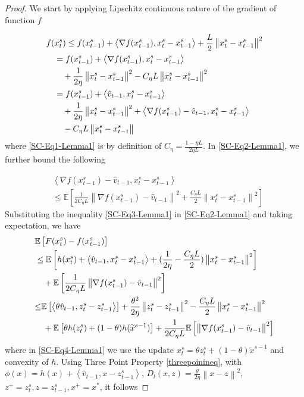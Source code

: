\documentclass{article}
\newcommand*{\E}{\mathbb{E}}
\newcommand{\norm}[1]{\left\lVert#1\right\rVert}
\newcommand{\Iprod}[2]{\left\langle #1,#2\right\rangle}
\theoremstyle{definition}
\theoremstyle{remark}
\begin{document}
{
\begin{proof}
We start by applying Lipschitz continuous nature of the gradient of function $f$ 

\begin{align}
f(&x_{t}^s)  \leq f(x_{t-1}^s) + \Iprod{\nabla f(x_{t-1}^s)}{x_{t}^s-x_{t-1}^s}+\frac{L}{2}\norm{x_{t}^s-x_{t-1}^s}^2\notag\\
&=f(x_{t-1}^s) + \Iprod{\nabla f(x_{t-1}^s)}{x_{t}^s-x_{t-1}^s}\notag\\
&~~~+ {\frac{1 }{2\eta}}\norm{x_{t}^s-x_{t-1}^s}^2-{C_{\eta} L}\norm{x_{t}^s-x_{t-1}^s}^2\label{SC-Eq1-Lemma1}\\
&= f(x_{t-1}^s) + \Iprod{\hat{v}_{t-1}}{x_{t}^s-x_{t-1}^s}\notag\\
&~~~+ { \frac{1}{2\eta}}\norm{x_{t}^s-x_{t-1}^s}^2+\Iprod{\nabla f(x_{t-1}^s)-\hat{v}_{t-1}}{x_{t}^s-x_{t-1}^s}\notag\\
&~~~-{C_{\eta} L}\norm{x_{t}^s-x_{t-1}^s}\label{SC-Eq2-Lemma1}
\end{align}
where \eqref{SC-Eq1-Lemma1} is by definition of $C_{\eta} = \frac{1-\eta L}{2\eta L}$. 
In \eqref{SC-Eq2-Lemma1}, we further bound the following

\begin{equation}\label{SC-Eq3-Lemma1}
\begin{split}
&\Iprod{\nabla f(x_{t-1}^s)-\hat{v}_{t-1}}{x_{t}^s-x_{t-1}^s}\\
&{\leq} \E\left[\frac{1}{2C_{\eta} L}\norm{\nabla f(x_{t-1}^s)-\hat{v}_{t-1}}^2 + \frac{C_{\eta} L}{2}\norm{x_{t}^s-x_{t-1}^s}^2\right]
\end{split}
\end{equation}
Substituting the inequality \eqref{SC-Eq3-Lemma1} in \eqref{SC-Eq2-Lemma1} and taking expectation, we have
\begin{align}
&\E \left[ F(x_{t}^s) -f(x_{t-1}^s)\right]\notag\\
&\leq \E\left[h(x_{t}^s)+ \Iprod{\hat{v}_{t-1}}{x_{t}^s-x_{t-1}^s}+{(\frac{1}{2\eta}-\frac{C_{\eta} L}{2})}\norm{x_{t}^s-x_{t-1}^s}^2\right]\notag\\
&~~~+\E\left[\frac{1}{2C_{\eta} L}\norm{\nabla f(x_{t-1}^s)-\hat{v}_{t-1}}^2\right]\notag\\
&{\leq}\E\left[\Iprod{\theta\hat{v}_{t-1}}{z_{t}^s-z_{t-1}^s}\right]+{\frac{{ \theta^2}}{2\eta}}\norm{z_{t}^s-z_{t-1}^s}^2-\frac{C_{\eta} L}{2}\norm{x_{t}^s-x_{t-1}^s}^2\notag\\
&~~~+\E\left[\theta h(z_{t}^s)+(1-\theta) h(\widetilde{x}^{s-1})\right]+\frac{1}{2C_{\eta} L}\E\left[\norm{\nabla f(x_{t-1}^s)-\hat{v}_{t-1}}^2\right]\label{SC-Eq4-Lemma1}
\end{align}
where in \eqref{SC-Eq4-Lemma1} we use the update $x_t^s = \theta z_t^s+(1-\theta)\widetilde{x}^{s-1}$ and convexity of $h$. Using Three Point Property \ref{threepoinineq}, with $\phi(x) = h(x)+\Iprod{\hat{v}_{t-1}}{x-z_{t-1}^s}$, $D_l(x,z) = {\frac{\theta}{2\eta}}\norm{x-z}^2$, $z^+ = z_t^s, z = z_{t-1}^s, x^+ = x^*$, it follows


\end{proof}}
\end{document}
